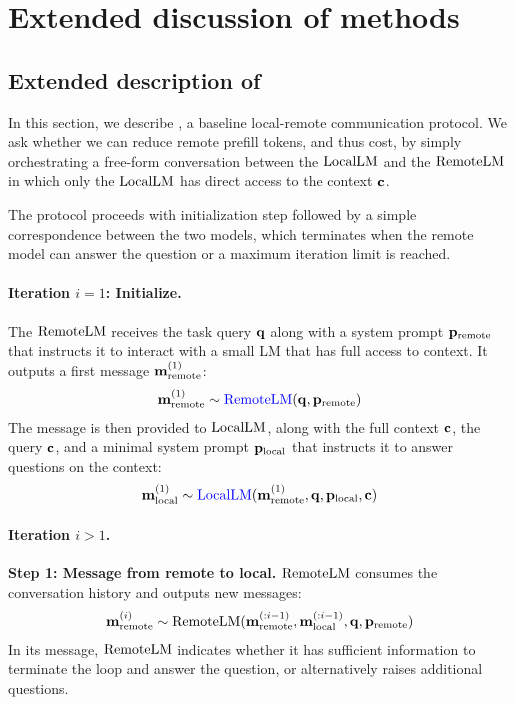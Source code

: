 \section{Extended discussion of methods}
\label{app:methods}

\subsection{Extended description of \naive}
\label{app:methods-naive}

In this section, we describe \naive, a baseline local-remote communication protocol. 
We ask whether we can reduce remote prefill tokens, and thus cost, by simply orchestrating a free-form conversation between the $\mathrm{LocalLM}$ and the $\mathrm{RemoteLM}$ in which only the $\mathrm{LocalLM}$ has direct access to the context $\mathbf{c}$.

The protocol proceeds with initialization step followed by a simple correspondence between the two models, which terminates when the remote model can answer the question or a maximum iteration limit is reached. 

\paragraph{Iteration $i = 1$: Initialize.}
The $\mathrm{RemoteLM}$ receives the task query $\mathbf{q}$ along with a system prompt $\mathbf{p}_{\text{remote}}$ that instructs it to  interact with a small LM that has full access to context. It outputs a first message $\mathbf{m}_{\text{remote}}^{(1)}$:
\begin{align*}
    \mathbf{m}_{\text{remote}}^{(1)} \sim \textcolor{blue}{\mathrm{RemoteLM}}(\mathbf{q}, \mathbf{p}_{\text{remote}})
\end{align*}
The message is then provided to $\mathrm{LocalLM}$, along with the full context $\mathbf{c}$, the query $\mathbf{c}$,
and a minimal system prompt $\mathbf{p}_{\text{local}}$ that instructs it to answer questions on the context:
\begin{align*}
    \mathbf{m}_{\text{local}}^{(1)} \sim \textcolor{blue}{\mathrm{LocalLM}}(\mathbf{m}_{\text{remote}}^{(1)}, \mathbf{q}, \mathbf{p}_{\text{local}}, \mathbf{c})
\end{align*}
\paragraph{Iteration $i > 1$.}
\textbf{Step 1: Message from remote to local.}
$\mathrm{RemoteLM}$ consumes the conversation history and outputs new messages: 
\begin{align*}
    \mathbf{m}_{\text{remote}}^{(i)} \sim \mathrm{RemoteLM}(\mathbf{m}_{\text{remote}}^{(:i - 1)}, \mathbf{m}_{\text{local}}^{(:i - 1)} , \mathbf{q}, \mathbf{p}_{\text{remote}})
\end{align*}
In its message, $\mathrm{RemoteLM}$ indicates whether it has sufficient information to terminate the loop and answer the question, or alternatively raises additional questions. 


